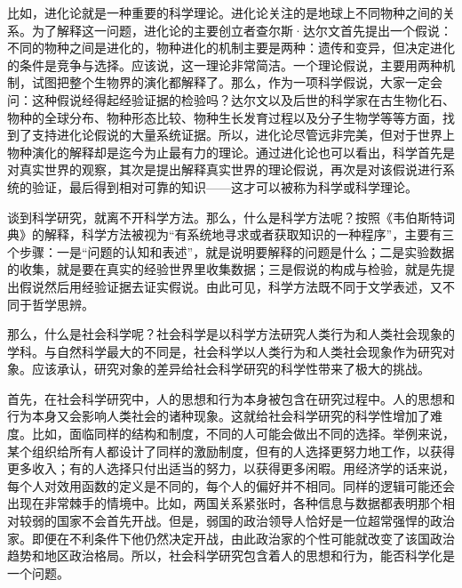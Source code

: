 比如，进化论就是一种重要的科学理论。进化论关注的是地球上不同物种之间的关系。为了解释这一问题，进化论的主要创立者查尔斯·达尔文首先提出一个假说：不同的物种之间是进化的，物种进化的机制主要是两种：遗传和变异，但决定进化的条件是竞争与选择。应该说，这一理论非常简洁。一个理论假说，主要用两种机制，试图把整个生物界的演化都解释了。那么，作为一项科学假说，大家一定会问：这种假说经得起经验证据的检验吗？达尔文以及后世的科学家在古生物化石、物种的全球分布、物种形态比较、物种生长发育过程以及分子生物学等等方面，找到了支持进化论假说的大量系统证据。所以，进化论尽管远非完美，但对于世界上物种演化的解释却是迄今为止最有力的理论。通过进化论也可以看出，科学首先是对真实世界的观察，其次是提出解释真实世界的理论假说，再次是对该假说进行系统的验证，最后得到相对可靠的知识——这才可以被称为科学或科学理论。

谈到科学研究，就离不开科学方法。那么，什么是科学方法呢？按照《韦伯斯特词典》的解释，科学方法被视为“有系统地寻求或者获取知识的一种程序”，主要有三个步骤：一是“问题的认知和表述”，就是说明要解释的问题是什么；二是实验数据的收集，就是要在真实的经验世界里收集数据；三是假说的构成与检验，就是先提出假说然后用经验证据去证实假说。由此可见，科学方法既不同于文学表述，又不同于哲学思辨。


那么，什么是社会科学呢？社会科学是以科学方法研究人类行为和人类社会现象的学科。与自然科学最大的不同是，社会科学以人类行为和人类社会现象作为研究对象。应该承认，研究对象的差异给社会科学研究的科学性带来了极大的挑战。

首先，在社会科学研究中，人的思想和行为本身被包含在研究过程中。人的思想和行为本身又会影响人类社会的诸种现象。这就给社会科学研究的科学性增加了难度。比如，面临同样的结构和制度，不同的人可能会做出不同的选择。举例来说，某个组织给所有人都设计了同样的激励制度，但有的人选择更努力地工作，以获得更多收入；有的人选择只付出适当的努力，以获得更多闲暇。用经济学的话来说，每个人对效用函数的定义是不同的，每个人的偏好并不相同。同样的逻辑可能还会出现在非常棘手的情境中。比如，两国关系紧张时，各种信息与数据都表明那个相对较弱的国家不会首先开战。但是，弱国的政治领导人恰好是一位超常强悍的政治家。即便在不利条件下他仍然决定开战，由此政治家的个性可能就改变了该国政治趋势和地区政治格局。所以，社会科学研究包含着人的思想和行为，能否科学化是一个问题。

